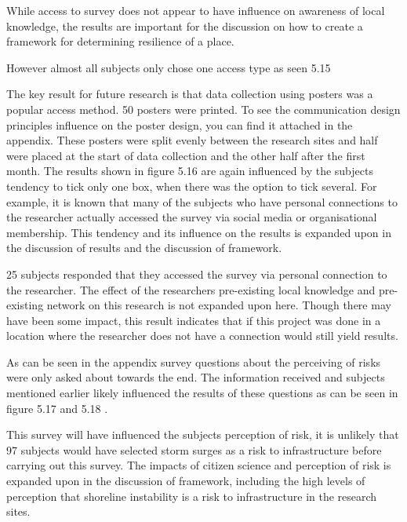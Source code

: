   While access to survey does not appear to have influence on awareness of local knowledge, the results are important for the discussion on how to create a framework for determining resilience of a place.

   However almost all subjects only chose one access type as seen 5.15

The key result for future research is that data collection using posters was a popular access method. 50 posters were printed. To see the communication design principles influence on the poster design, you can find it attached in the appendix. These posters were split evenly between the research sites and half were placed at the start of data collection and the other half after the first month. The results shown in figure 5.16 are again influenced by the subjects tendency to tick only one box, when there was the option to tick several. For example, it is known that many of the subjects who have personal connections to the researcher actually accessed the survey via social media or organisational membership. This tendency and its influence on the results is expanded upon in the discussion of results and the discussion of framework.



25 subjects responded that they accessed the survey via personal connection to the researcher. The effect of the researchers pre-existing local knowledge and pre-existing network on this research is not expanded upon here. Though there may have been some impact, this result indicates that if this project was done in a location where the researcher does not have a connection would still yield results.

As can be seen in the appendix survey questions about the perceiving of risks were only asked about towards the end. The information received and subjects mentioned earlier likely influenced the results of these questions as can be seen in figure 5.17 and 5.18 .


This survey will have influenced the subjects perception of risk, it is unlikely that 97 subjects would have selected storm surges as a risk to infrastructure before carrying out this survey. The impacts of citizen science and perception of risk is expanded upon in the discussion of framework, including the high levels of perception that shoreline instability is a risk to infrastructure in the research sites.



